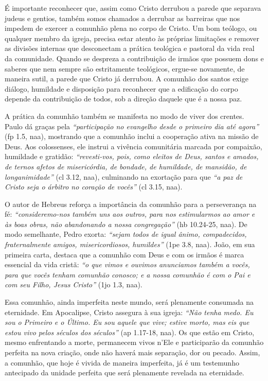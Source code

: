 É importante reconhecer que, assim como Cristo derrubou a parede que separava judeus e gentios, também somos chamados a derrubar as barreiras que nos impedem de exercer a comunhão plena no corpo de Cristo. Um bom teólogo, ou qualquer membro da igreja, precisa estar atento às próprias limitações e remover as divisões internas que desconectam a prática teológica e pastoral da vida real da comunidade. Quando se despreza a contribuição de irmãos que possuem dons e saberes que nem sempre são estritamente teológicos, ergue-se novamente, de maneira sutil, a parede que Cristo já derrubou. A comunhão dos santos exige diálogo, humildade e disposição para reconhecer que a edificação do corpo depende da contribuição de todos, sob a direção daquele que é a nossa paz.

A prática da comunhão também se manifesta no modo de viver dos crentes. Paulo dá graças pela \textit{``participação no evangelho desde o primeiro dia até agora''} (\gls{fp} 1.5, \gls{naa}), mostrando que a comunhão inclui a cooperação ativa na missão de Deus. Aos colossenses, ele instrui a vivência comunitária marcada por compaixão, humildade e gratidão: \textit{``revesti-vos, pois, como eleitos de Deus, santos e amados, de ternos afetos de misericórdia, de bondade, de humildade, de mansidão, de longanimidade''} (\gls{cl} 3.12, \gls{naa}), culminando na exortação para que \textit{``a paz de Cristo seja o árbitro no coração de vocês''} (\gls{cl} 3.15, \gls{naa}).

O autor de Hebreus reforça a importância da comunhão para a perseverança na fé: \textit{``consideremo-nos também uns aos outros, para nos estimularmos ao amor e às boas obras, não abandonando a nossa congregação''} (\gls{hb} 10.24-25, \gls{naa}). De modo semelhante, Pedro exorta: \textit{``sejam todos de igual ânimo, compadecidos, fraternalmente amigos, misericordiosos, humildes''} (\gls{1pe} 3.8, \gls{naa}). João, em sua primeira carta, destaca que a comunhão com Deus e com os irmãos é marca essencial da vida cristã: \textit{``o que vimos e ouvimos anunciamos também a vocês, para que vocês tenham comunhão conosco; e a nossa comunhão é com o Pai e com seu Filho, Jesus Cristo''} (\gls{1jo} 1.3, \gls{naa}).

Essa comunhão, ainda imperfeita neste mundo, será plenamente consumada na eternidade. Em Apocalipse, Cristo assegura à sua igreja: \textit{``Não tenha medo. Eu sou o Primeiro e o Último. Eu sou aquele que vive; estive morto, mas eis que estou vivo pelos séculos dos séculos''} (\gls{ap} 1.17-18, \gls{naa}). Os que estão em Cristo, mesmo enfrentando a morte, permanecem vivos n'Ele e participarão da comunhão perfeita na nova criação, onde não haverá mais separação, dor ou pecado. Assim, a comunhão, que hoje é vivida de maneira imperfeita, já é um testemunho antecipado da unidade perfeita que será plenamente revelada na eternidade.

